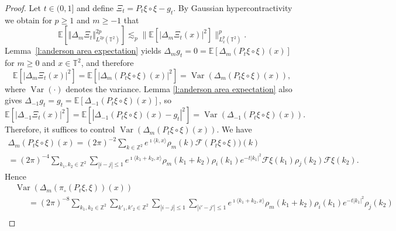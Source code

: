 \documentclass[11pt,a4paper]{article}
\newcommand{\tmop}[1]{\ensuremath{\operatorname{#1}}}
\theoremstyle{remark}
\newcommand{\Z}{\mathbb{Z}}
\newcommand{\E}{\mathbb{E}}
\newcommand{\CF}{\ensuremath{\mathscr{F}}}
\begin{document}
\begin{proof}
   Let $t \in (0,1]$ and define $\Xi_t = P_t \xi \circ \xi - g_t$. By Gaussian hypercontractivity we obtain for $p\ge 1$ and $m \ge - 1$ that
   \begin{equation}\label{e:anderson area hyper}
      \E [\Vert  \Delta_m \Xi_t \Vert_{L^{2 p} ( \mathbb{T}^2 )}^{2 p}] \lesssim_p \lVert \E[|\Delta_m \Xi_t ( x ) |^2] \rVert ^p_{L^p_x(\mathbb{T}^2)}.
   \end{equation}
   Lemma~\ref{l:anderson area expectation} yields $\Delta_m g_t = 0 = \E [\Delta_m ( P_t \xi\circ \xi )(x)]$ for $m \ge 0$ and $x \in \mathbb{T}^2$, and therefore
   \begin{equation}\label{e:anderson area m-block}
      \E[| \Delta_m \Xi_t(x)|^2] = \E[| \Delta_m ( P_t \xi\circ \xi ) ( x )|^2] = \tmop{Var} ( \Delta_m ( P_t \xi\circ \xi ) ( x ) ),
   \end{equation}
   where $\tmop{Var}(\cdot)$ denotes the variance. Lemma \ref{l:anderson area expectation} also gives $\Delta_{- 1} g_t = g_t= \E[ \Delta_{- 1} ( P_t \xi\circ \xi )(x) ]$, so
   \begin{equation}\label{e:anderson area -1-block}
      \E [| \Delta_{- 1} \Xi_t ( x ) |^2 ] = \E[ |\Delta_{- 1} ( P_t \xi\circ \xi ) (x ) - g_t |^2] = \tmop{Var} ( \Delta_{- 1} (P_t \xi\circ \xi ) ( x ) ) .
   \end{equation}
   Therefore, it suffices to control $\tmop{Var} ( \Delta_m ( P_t \xi\circ \xi ) ( x ) )$. We have
   \begin{gather*}
      \Delta_m ( P_t \xi\circ \xi ) (x) = (2\pi)^{-2} \sum_{k \in \Z^2} e^{\imath\langle k,x\rangle} \rho_m(k) \CF(P_t \xi\circ \xi))(k)\\
       = ( 2 \pi )^{- 4} \sum_{k_1, k_2 \in \mathbb{Z}^2}\sum_{| i - j | \leqslant 1} e^{\imath \langle k_1 + k_2, x \rangle} \rho_m ( k_1 + k_2 ) \rho_i ( k_1 )     e^{- t | k_1 |^2} \CF{\xi} ( k_1 ) \rho_j (k_2) \CF{\xi} ( k_2 ).
   \end{gather*}
   Hence
   \begin{align*}
      &\tmop{Var} ( \Delta_m ( \pi_{\circ} ( P_t \xi, \xi )) ( x ) )\\
      &\hspace{20pt} = ( 2 \pi )^{- 8} \sum_{k_1, k_2 \in \mathbb{Z}^2} \sum_{k'_1, k'_2 \in \mathbb{Z}^2} \sum_{| i - j | \leqslant 1} \sum_{| i' - j' | \leqslant 1} e^{\imath \langle k_1 + k_2, x \rangle} \rho_m ( k_1 + k_2 ) \rho_i ( k_1) e^{- t | k_1 |^2} \rho_j ( k_2 )\\

\end{align*}
\end{proof}
\end{document}
